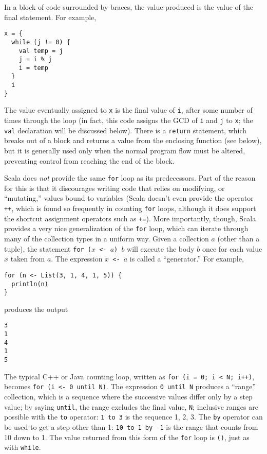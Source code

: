 \documentclass[11pt]{article}
\begin{document}
In a block of code surrounded by braces, the value produced is the value of the final statement. For example,
\begin{verbatim}
x = {
  while (j != 0) {
    val temp = j
    j = i % j
    i = temp
  }
  i
}
\end{verbatim}
The value eventually assigned to \texttt{x} is the final value of \texttt{i}, after some number of times through the loop (in fact, this code assigns the GCD of \texttt{i} and \texttt{j} to \texttt{x}; the \texttt{val} declaration will be discussed below). There is a \texttt{return} statement, which breaks out of a block and returns a value from the enclosing function (see below), but it is generally used only when the normal program flow must be altered, preventing control from reaching the end of the block.

Scala does \emph{not} provide the same \texttt{for} loop as its predecessors. Part of the reason for this is that it discourages writing code that relies on modifying, or ``mutating,'' values bound to variables (Scala doesn't even provide the operator \texttt{++}, which is found so frequently in counting \texttt{for} loops, although it does support the shortcut assignment operators such as \texttt{+=}). More importantly, though, Scala provides a very nice generalization of the \texttt{for} loop, which can iterate through many of the collection types in a uniform way. Given a collection $a$ (other than a tuple), the statement \texttt{for ($x$ <- $a$) $b$} will execute the body $b$ once for each value $x$ taken from $a$. The expression \texttt{$x$ <- $a$} is called a ``generator.'' For example,
\begin{verbatim}
for (n <- List(3, 1, 4, 1, 5)) {
  println(n)
}
\end{verbatim}
produces the output
\begin{verbatim}
3
1
4
1
5
\end{verbatim}
The typical C++ or Java counting loop, written as \texttt{for (i = 0; i < N; i++)}, becomes \texttt{for (i <- 0 until N)}. The expression \texttt{0 until N} produces a ``range'' collection, which is a sequence where the successive values differ only by a step value; by saying \texttt{until}, the range excludes the final value, \texttt{N}; inclusive ranges are possible with the \texttt{to} operator: \texttt{1 to 3} is the sequence 1, 2, 3. The \texttt{by} operator can be used to get a step other than 1: \texttt{10 to 1 by -1} is the range that counts from 10 down to 1. The value returned from this form of the \texttt{for} loop is \texttt{()}, just as with \texttt{while}.
\end{document}
